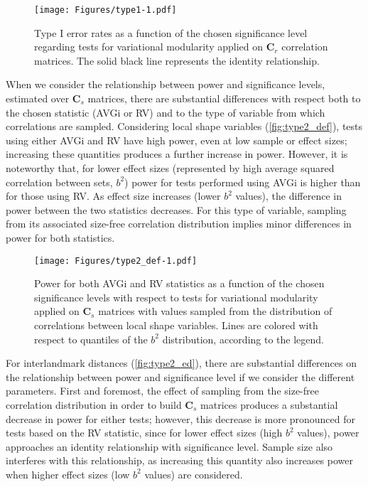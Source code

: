 \documentclass[12pt,]{article}
\begin{document}
\begin{figure}[htbp]
\centering
\texttt{[image: Figures/type1-1.pdf]}
\caption{Type I error rates as a function of the chosen significance
level regarding tests for variational modularity applied on
$\mathbf{C}_r$ correlation matrices. The solid black line represents the
identity relationship. \label{fig:type1}}
\end{figure}

When we consider the relationship between power and significance levels,
estimated over $\mathbf{C}_s$ matrices, there are substantial
differences with respect both to the chosen statistic (AVGi or RV) and
to the type of variable from which correlations are sampled. Considering
local shape variables (\autoref{fig:type2_def}), tests using either AVGi
and RV have high power, even at low sample or effect sizes; increasing
these quantities produces a further increase in power. However, it is
noteworthy that, for lower effect sizes (represented by high average
squared correlation between sets, $b^2$) power for tests performed using
AVGi is higher than for those using RV. As effect size increases (lower
$b^2$ values), the difference in power between the two statistics
decreases. For this type of variable, sampling from its associated
size-free correlation distribution implies minor differences in power
for both statistics.

\begin{figure}[htbp]
\centering
\texttt{[image: Figures/type2\_def-1.pdf]}
\caption{Power for both AVGi and RV statistics as a function of the
chosen significance levels with respect to tests for variational
modularity applied on $\mathbf{C}_s$ matrices with values sampled from
the distribution of correlations between local shape variables. Lines
are colored with respect to quantiles of the $b^2$ distribution,
according to the legend. \label{fig:type2_def}}
\end{figure}

For interlandmark distances (\autoref{fig:type2_ed}), there are
substantial differences on the relationship between power and
significance level if we consider the different parameters. First and
foremost, the effect of sampling from the size-free correlation
distribution in order to build $\mathbf{C}_s$ matrices produces a
substantial decrease in power for either tests; however, this decrease
is more pronounced for tests based on the RV statistic, since for lower
effect sizes (high $b^2$ values), power approaches an identity
relationship with significance level. Sample size also interferes with
this relationship, as increasing this quantity also increases power when
higher effect sizes (low $b^2$ values) are considered.
\end{document}
